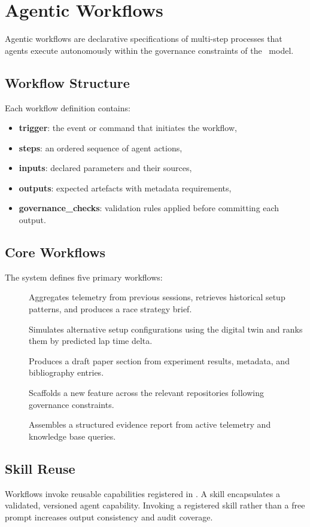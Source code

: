 \section{Agentic Workflows}
\label{sec:agentic-workflows}

Agentic workflows are declarative specifications of multi-step processes that
agents execute autonomously within the governance constraints of the \kdd~model.

\subsection{Workflow Structure}

Each workflow definition contains:

\begin{itemize}
  \item \textbf{trigger}: the event or command that initiates the workflow,
  \item \textbf{steps}: an ordered sequence of agent actions,
  \item \textbf{inputs}: declared parameters and their sources,
  \item \textbf{outputs}: expected artefacts with metadata requirements,
  \item \textbf{governance\_checks}: validation rules applied before committing
    each output.
\end{itemize}

\subsection{Core Workflows}

The system defines five primary workflows:

\begin{description}
  \item[] Aggregates telemetry from previous sessions,
    retrieves historical setup patterns, and produces a race strategy brief.
  \item[] Simulates alternative setup configurations
    using the digital twin and ranks them by predicted lap time delta.
  \item[] Produces a draft paper section from
    experiment results, metadata, and bibliography entries.
  \item[] Scaffolds a new feature across the
    relevant repositories following governance constraints.
  \item[] Assembles a structured evidence
    report from active telemetry and knowledge base queries.
\end{description}

\subsection{Skill Reuse}

Workflows invoke reusable capabilities registered in .
A skill encapsulates a validated, versioned agent capability. Invoking a registered
skill rather than a free prompt increases output consistency and audit coverage.

